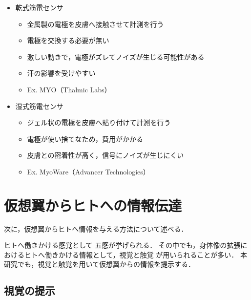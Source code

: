         \begin{itemize}
        \item 乾式筋電センサ
            \begin{itemize}
            \item 金属製の電極を皮膚へ接触させて計測を行う
            \item 電極を交換する必要が無い
            \item 激しい動きで，電極がズレてノイズが生じる可能性がある
            \item 汗の影響を受けやすい
            \item Ex. MYO（Thalmic Labs）
            \end{itemize}

        \item 湿式筋電センサ
            \begin{itemize}
            \item ジェル状の電極を皮膚へ貼り付けて計測を行う
            \item 電極が使い捨てなため，費用がかかる
            \item 皮膚との密着性が高く，信号にノイズが生じにくい
            \item Ex. MyoWare（Advancer Technologies）
            \end{itemize}
        \end{itemize}

    
\section{仮想翼からヒトへの情報伝達}
    次に，仮想翼からヒトへ情報を与える方法について述べる．

    ヒトへ働きかける感覚として
    五感が挙げられる．
    その中でも，身体像の拡張におけるヒトへ働きかける情報として，視覚と触覚
    が用いられることが多い．
    本研究でも，視覚と触覚を用いて仮想翼からの情報を提示する．

    \subsection{視覚の提示}
        
